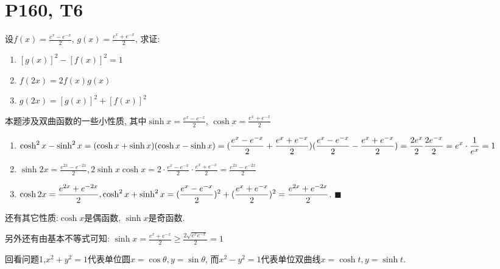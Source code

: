\documentclass{book}
\begin{document}
    \section{\textcolor[rgb]{0.11,0.65,0.52}{P160, T6}}
    \begin{boxB}
        设$\displaystyle f(x)=\frac{e^x-e^{-x}}{2}$, $\displaystyle g(x)=\frac{e^x+e^{-x}}{2}$, 求证:\par
        \begin{enumerate}
            \item $[g(x)]^2-[f(x)]^2=1$
            \item $f(2x)=2f(x)g(x)$
            \item $g(2x)=[g(x)]^2+[f(x)]^2$
        \end{enumerate}
    \end{boxB}
    本题涉及\textcolor[rgb]{0.38,0.11,0.2}{双曲函数}的一些小性质, 其中$\displaystyle \sinh x = \frac{e^x-e^{-x}}{2}$, $\displaystyle \cosh x = \frac{e^x+e^{-x}}{2}$
    \begin{enumerate}
        \item $\displaystyle \cosh^2 x-\sinh^2x=(\cosh x+\sinh x)(\cosh x-\sinh x)\\=(\frac{e^x-e^{-x}}{2}+\frac{e^x+e^{-x}}{2})(\frac{e^x-e^{-x}}{2}-\frac{e^x+e^{-x}}{2})=\frac{2e^x}{2}\frac{2e^{-x}}{2}=e^x\cdot \frac{1}{e^x}=1$
        \item $\displaystyle \sinh 2x=\frac{e^{2x}-e^{-2x}}{2}, 2\sinh x \cosh x=2\cdot \frac{e^x-e^{-x}}{2}\cdot \frac{e^x+e^{-x}}{2}=\frac{e^{2x}-e^{-2x}}{2}$
        \item $\displaystyle \cosh 2x=\frac{e^{2x}+e^{-2x}}{2}, \cosh^2x+\sinh^2x=(\frac{e^x-e^{-x}}{2})^2+ (\frac{e^x+e^{-x}}{2})^2\\=\frac{e^{2x}+e^{-2x}}{2}$. $\blacksquare$
    \end{enumerate}

    还有其它性质:$\cosh x$是偶函数, $\sinh x$是奇函数.

    另外还有由\textcolor[rgb]{0.75,0.17,0.22}{基本不等式}可知: $\displaystyle \sinh x=\frac{e^x+e^{-x}}{2} \geqslant \frac{2\sqrt{e^xe^{-x}}}{2}=1$

    \textcolor[rgb]{0.38,0.11,0.2}{回看问题1,$x^2+y^2=1$代表单位圆$x=\cos \theta, y=\sin \theta$, 而$x^2-y^2=1$代表单位双曲线$x=\cosh t, y=\sinh t$.}
\end{document}
